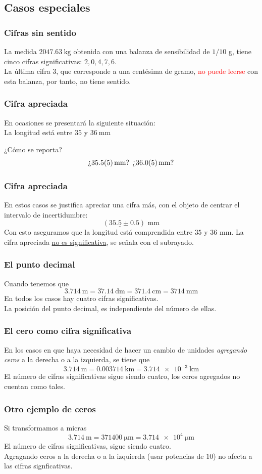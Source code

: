 \subsection*{Casos especiales}
\begin{frame}
\frametitle{Cifras sin sentido}
La medida $\SI{2047.63}{\kilogram}$ obtenida con una balanza de sensibilidad de $1/10$ g, tiene cinco cifras significativas: $2, 0, 4, 7, 6$.
\\
\bigskip
\pause
La última cifra $3$, que corresponde a una centésima de gramo, \textcolor{red}{no puede leerse} con esta balanza, por tanto, no tiene sentido.
\end{frame}
\begin{frame}
\frametitle{Cifra apreciada}
En ocasiones se presentará la siguiente situación:
\\
\bigskip
La longitud está entre $\num{35}$ y $\SI{36}{\mm}$
\begin{figure}
    \centering
    
\end{figure}
\pause
¿Cómo se reporta?
\[ \mbox{¿} \SI{35.5+-0.5}{\mm} \mbox{?   ¿} \SI{36+-0.5}{\mm} \mbox{?} \]
\end{frame}
\begin{frame}
\frametitle{Cifra apreciada}
En estos casos se justifica apreciar una cifra más, con el objeto de centrar el intervalo de incertidumbre:
\[ (35. \underline{5} \pm 0.5) \mbox{ mm} \]
\pause
Con esto aseguramos que la longitud está comprendida entre $35$ y $36$ mm. La cifra apreciada \underline{no es significativa}, se señala con el subrayado.
\end{frame}
\begin{frame}
\frametitle{El punto decimal}
Cuando tenemos que\[ \SI{3.714}{\meter} = \SI{37.14}{\dm} = \SI{371.4}{\cm} = \SI{3714}{\mm} \]
\pause
En todos los casos hay cuatro cifras significativas.
\\
\bigskip
\pause
La posición del punto decimal, es independiente del número de ellas.
\end{frame}
\begin{frame}
\frametitle{El cero como cifra significativa}
En los casos en que haya necesidad de hacer un cambio de unidades \emph{agregando ceros} a la derecha o a la izquierda, se tiene que
\[ \SI{3.714}{\meter} = \SI{0.003714}{\kilo\meter} = \SI{3.714e-3}{\kilo\meter} \]
\pause
El número de cifras significativas sigue siendo cuatro, los ceros agregados no cuentan como tales.
\end{frame}
\begin{frame}
\frametitle{Otro ejemplo de ceros}
Si transformamos a micras
\[ \SI{3.714}{\meter} = \SI{371400}{\micro\meter} = \SI{3.714e4}{\micro\meter}  \]
El número de cifras significativas, sigue siendo cuatro.
\\
\bigskip
\pause
Agragando ceros a la derecha o a la izquierda (usar potencias de $10$) no afecta a las cifras signficativas.
\end{frame}

